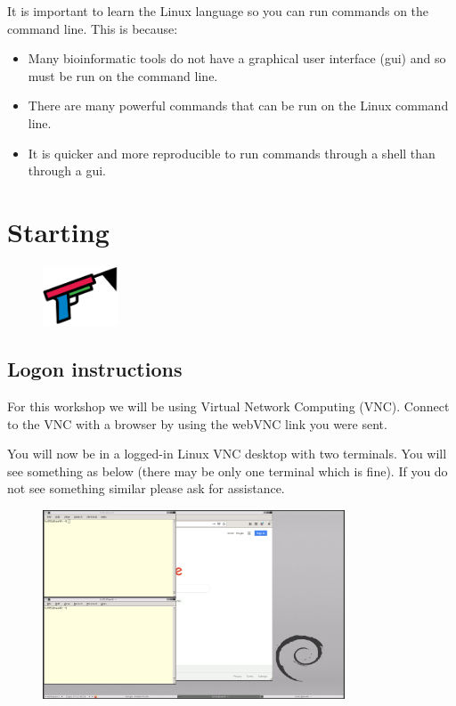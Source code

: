 \documentclass[
  letterpaper,
  DIV=11,
  numbers=noendperiod]{scrreprt}
\providecommand{\tightlist}{%
  \setlength{\itemsep}{0pt}\setlength{\parskip}{0pt}}\usepackage{longtable,booktabs,array}
\begin{document}
It is important to learn the Linux language so you can run commands on
the command line. This is because:

\begin{itemize}
\tightlist
\item
  Many bioinformatic tools do not have a graphical user interface (gui)
  and so must be run on the command line.
\item
  There are many powerful commands that can be run on the Linux command
  line.
\item
  It is quicker and more reproducible to run commands through a shell
  than through a gui.
\end{itemize}

\hypertarget{starting}{%
\chapter{Starting}\label{starting}}

\begin{figure}

{\centering \includegraphics[width=0.2\textwidth,height=\textheight]{figures/start.png}

}

\end{figure}

\hypertarget{cluster}{%
\section{Logon instructions}\label{cluster}}

For this workshop we will be using Virtual Network Computing (VNC).
Connect to the VNC with a browser by using the webVNC link you were
sent.

You will now be in a logged-in Linux VNC desktop with two terminals. You
will see something as below (there may be only one terminal which is
fine). If you do not see something similar please ask for assistance.

\begin{figure}

{\centering \includegraphics[width=0.8\textwidth,height=\textheight]{figures/logon_pic.png}

}

\end{figure}
\end{document}
